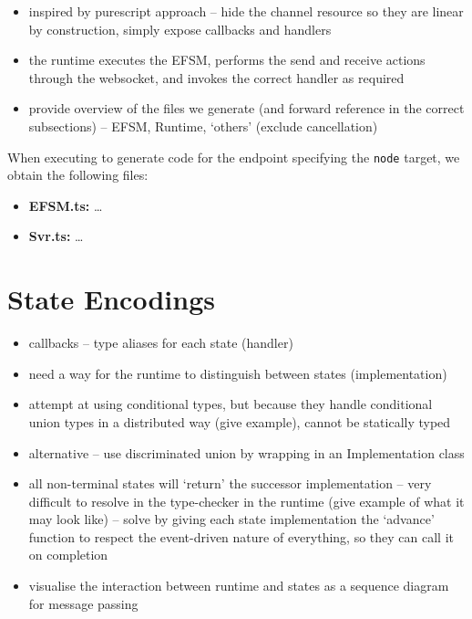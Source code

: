\begin{itemize}

\item inspired by purescript approach -- hide the channel resource so they are linear by construction, simply expose callbacks and handlers
\item the runtime executes the EFSM, performs the send and receive actions through the websocket, and invokes the correct handler as required
\item provide overview of the files we generate (and forward reference in the correct subsections) -- EFSM, Runtime, `others' (exclude cancellation)
\end{itemize}

When executing  to generate code for the
 endpoint specifying the \texttt{node} target,
we obtain the following files:

\begin{itemize}
\item \textbf{EFSM.ts:} \dots
\item \textbf{Svr.ts:} \dots
\end{itemize}

\section{State Encodings}
\label{section:nodeefsm}

\begin{itemize}
\item callbacks -- type aliases for each state (handler)
\item need a way for the runtime to distinguish between states (implementation)
\item attempt at using conditional types, but because they handle conditional union types in a distributed way (give example), cannot be statically typed
\item alternative -- use discriminated union by wrapping in an Implementation class
\item all non-terminal states will `return' the successor implementation -- very difficult to resolve in the type-checker in the runtime (give example of what it may look like) -- solve by giving each state implementation the `advance' function to respect the event-driven nature of everything, so they can call it on completion
\item visualise the interaction between runtime and states as a sequence diagram for message passing
\end{itemize}

